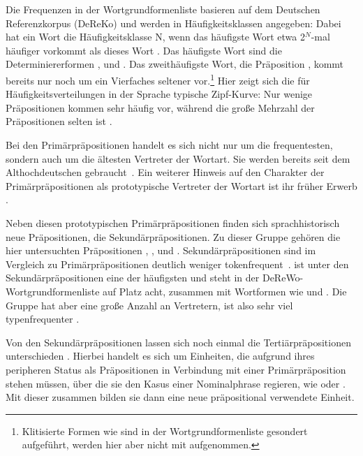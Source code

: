 Die Frequenzen in der Wortgrundformenliste basieren auf dem Deutschen Referenzkorpus (DeReKo) und werden in Häufigkeitsklassen angegeben: \glqq Dabei hat ein Wort die
Häufigkeitsklasse N, wenn das häufigste Wort etwa 2$^{N}$-mal häufiger vorkommt als dieses Wort\grqq{} \citep[13]{InstitutfurDeutscheSprache2012}. 
Das häufigste Wort sind die Determiniererformen ,  und . 
Das zweithäufigste Wort, die Präposition , kommt bereits nur noch um ein Vierfaches seltener vor.\footnote{Klitisierte Formen wie  sind in der Wortgrundformenliste gesondert aufgeführt, werden hier aber nicht mit aufgenommen.} 
Hier zeigt sich die für Häufigkeitsverteilungen in der Sprache typische Zipf-Kurve: Nur wenige Präpositionen kommen sehr häufig vor, während die große Mehrzahl der Präpositionen selten ist \citep[s.][22--27]{Zipf.1972}.

Bei den Primärpräpositionen handelt es sich nicht nur um die frequentesten, sondern auch um die ältesten Vertreter der Wortart. 
Sie werden bereits seit dem Althochdeutschen gebraucht~\citep[s.][1]{Graff.1824}.
Ein weiterer Hinweis auf den Charakter der Primärpräpositionen als prototypische Vertreter der Wortart ist ihr früher Erwerb \citep[s.][203--206]{Becker2011}. 

Neben diesen prototypischen Primärpräpositionen finden sich sprachhistorisch neue Präpositionen, die Sekundärpräpositionen.
Zu dieser Gruppe gehören die hier untersuchten Präpositionen , ,  und . 
Sekund{\"a}rpr{\"a}positionen sind im Vergleich zu Prim{\"a}rpr{\"a}positionen deutlich weniger tokenfrequent~\citep[636--637]{Griehaber2009}.
 ist unter den Sekundärpräpositionen eine der häufigsten und steht in der DeReWo-Wortgrundformenliste auf Platz acht, zusammen mit Wortformen wie  und  \citep[s.][]{InstitutfurDeutscheSprache2012}. 
Die Gruppe hat aber eine große Anzahl an Vertretern, ist also sehr viel typenfrequenter \citep[s.][93]{Szczepaniak2011}.

Von den Sekundärpräpositionen lassen sich noch einmal die Tertiärpräpositionen unterschieden \citep[s.][631]{Griehaber2009}. 
Hierbei handelt es sich um Einheiten, die aufgrund ihres peripheren Status als Präpositionen in Verbindung mit einer Primärpräposition stehen müssen, über die sie den Kasus einer Nominalphrase regieren, wie  oder . 
Mit dieser zusammen bilden sie dann eine neue präpositional verwendete Einheit. 

